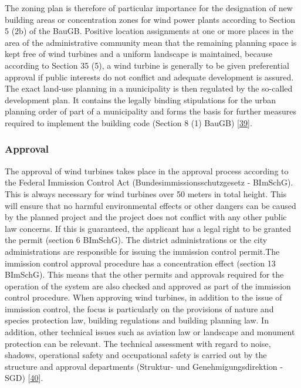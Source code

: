 \documentclass[a4paper,11pt]{article}
\begin{document}
The zoning plan is therefore of particular importance for the designation of new building areas or concentration zones for wind power plants according to Section 5 (2b) of the BauGB. Positive location assignments at one or more places in the area of the administrative community mean that the remaining planning space is kept free of wind turbines and a uniform landscape is maintained, because according to Section 35 (5), a wind turbine is generally to be given preferential approval if public interests do not conflict and adequate development is assured. The exact land-use planning in a municipality is then regulated by the so-called development plan. It contains the legally binding stipulations for the urban planning order of part of a municipality and forms the basis for further measures required to implement the building code (Section 8 (1) BauGB) {[}\protect\hyperlink{ref-BundesministeriumderJustizundfurVerbraucherschutz.1960}{39}{]}.

\hypertarget{approval}{%
\subsubsection{Approval}\label{approval}}

The approval of wind turbines takes place in the approval process according to the Federal Immission Control Act (Bundesimmissionsschutzgesetz - BImSchG). This is always necessary for wind turbines over 50 meters in total height. This will ensure that no harmful environmental effects or other dangers can be caused by the planned project and the project does not conflict with any other public law concerns. If this is guaranteed, the applicant has a legal right to be granted the permit (section 6 BImSchG). The district administrations or the city administrations are responsible for issuing the immission control permit.The immission control approval procedure has a concentration effect (section 13 BImSchG). This means that the other permits and approvals required for the operation of the system are also checked and approved as part of the immission control procedure. When approving wind turbines, in addition to the issue of immission control, the focus is particularly on the provisions of nature and species protection law, building regulations and building planning law. In addition, other technical issues such as aviation law or landscape and monument protection can be relevant. The technical assessment with regard to noise, shadows, operational safety and occupational safety is carried out by the structure and approval departments (Struktur- und Genehmigungsdirektion - SGD) {[}\protect\hyperlink{ref-FachagenturWindenergieanLand.2021}{40}{]}.
\end{document}
